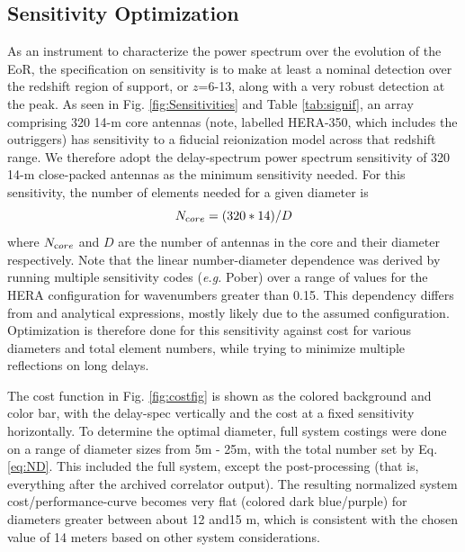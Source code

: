 \documentclass[preprint,11pt]{aastex}
\begin{document}
\subsection{Sensitivity Optimization}
\label{sec:cost}
As an instrument to characterize the power spectrum over the evolution of the EoR, the specification on sensitivity is to make at least a nominal detection over the redshift region of support, or $z$=6-13, along with a very robust detection at the peak.  As seen in Fig. \ref{fig:Sensitivities} and Table \ref{tab:signif}, an array comprising 320 14-m core antennas (note, labelled HERA-350, which includes the outriggers) has sensitivity to a
fiducial reionization model across that redshift range.  We therefore adopt the delay-spectrum power spectrum sensitivity of 320 14-m close-packed antennas as the minimum sensitivity needed.  
For this sensitivity, the number of elements needed for a given diameter is
\begin{equation}
\label{eq:ND}
N_{\text core} = (320*14)/D
\end{equation}
where $N_{\text core}$ and $D$ are the number of antennas in the core and their diameter respectively.  Note that the linear number-diameter dependence was derived by running multiple sensitivity codes ({\em e.g.} Pober) over a range of values for the HERA configuration for wavenumbers greater than 0.15.  This dependency differs from \cite{2013ExA....36..235M} and analytical expressions, mostly likely due to the assumed configuration.
Optimization is 
therefore done for this sensitivity against cost for various diameters and total element numbers, while trying to minimize multiple reflections on long delays.   

The cost function in Fig. \ref{fig:costfig} is shown as the colored background and color bar, with the delay-spec vertically and the cost at a fixed sensitivity horizontally. 
To determine the optimal diameter, full system costings were done on a range of diameter sizes from 5m - 25m, with the total number set by Eq. \ref{eq:ND}.  This included the full system, except the post-processing (that is, everything after the archived correlator output).  
The resulting normalized system cost/performance-curve  becomes very flat (colored dark blue/purple) for diameters greater between about 12 and15 m, which is consistent with the chosen value of 14 meters based on other system considerations.
\end{document}
